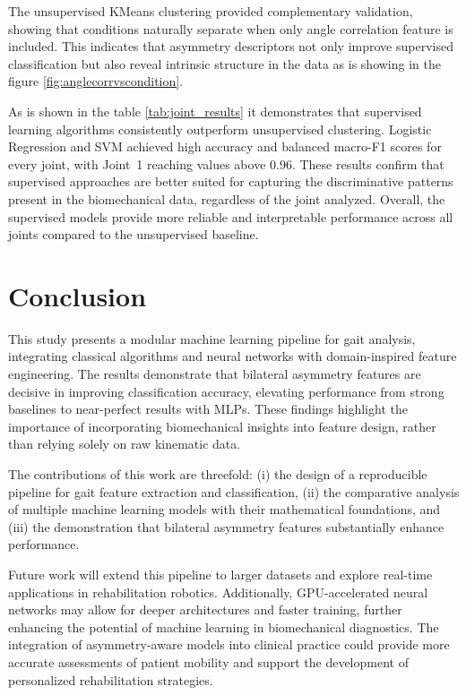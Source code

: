 \documentclass[journal]{IEEEtran}
\begin{document}
The unsupervised KMeans clustering provided complementary validation, showing that conditions naturally separate when only angle correlation feature is included. This indicates that 
asymmetry descriptors not only improve supervised classification but also reveal intrinsic structure in the data as is showing in the figure \ref{fig:anglecorrvscondition}.

As is shown in the table \ref{tab:joint_results} it demonstrates that supervised learning algorithms consistently
outperform unsupervised clustering. Logistic Regression and SVM achieved high accuracy and balanced macro-F1 scores for every joint, with Joint~1 reaching values above 0.96.
These results confirm that supervised approaches are better suited for capturing the discriminative patterns present in the biomechanical data, regardless 
of the joint analyzed. Overall, the supervised models provide more reliable and interpretable performance across all joints compared to the unsupervised baseline.

\section{Conclusion}

This study presents a modular machine learning pipeline for gait analysis, integrating classical algorithms and neural networks with domain-inspired feature engineering. 
The results demonstrate that bilateral asymmetry features are decisive in improving classification accuracy, elevating performance from strong baselines to near-perfect results with MLPs.
These findings highlight the importance of incorporating biomechanical insights into feature design, rather than relying solely on raw kinematic data.

The contributions of this work are threefold: (i) the design of a reproducible pipeline for gait feature extraction and classification, (ii) the comparative analysis of 
multiple machine learning models with their mathematical foundations, and (iii) the demonstration that bilateral asymmetry features substantially enhance performance. 

Future work will extend this pipeline to larger datasets and explore real-time applications in rehabilitation robotics. Additionally, GPU-accelerated neural networks may
allow for deeper architectures and faster training, further enhancing the potential of machine learning in biomechanical diagnostics. The integration of asymmetry-aware models into 
clinical practice could provide more accurate assessments of patient mobility and support the development of personalized rehabilitation strategies.
\end{document}
